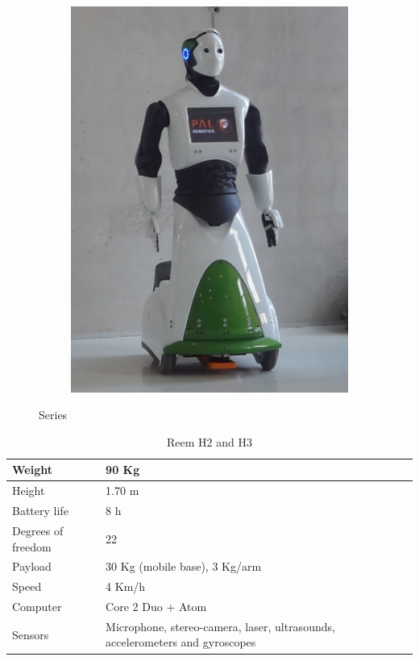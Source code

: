 \begin{figure}
\begin{subfigure}[b]{0.4\linewidth}
           \includegraphics{figures/reemh3}
           \caption{}
           \label{fig:reemh3}
    \end{subfigure}
    \caption{ Series}
    \label{fig:reemseries}
\end{figure}
\FloatBarrier
\begin{table}
    \centering
    \begin{tabularx}{\linewidth}{| X | X |}
    \hline
    Weight & 90 Kg\\ \hline
    Height & 1.70 m \\ \hline
    Battery life & 8 h \\ \hline
    Degrees of freedom & 22 \\ \hline
    Payload & 30 Kg (mobile base), 3 Kg/arm\\ \hline
    Speed & 4 Km/h\\ \hline
    Computer & Core 2 Duo + Atom\\ \hline
    Sensors & Microphone, stereo-camera, laser, ultrasounds, accelerometers and gyroscopes\\
    \hline
    \end{tabularx}
    \caption{Reem H2 and H3}
    \label{tab:rh2}
\end{table}
\FloatBarrier
